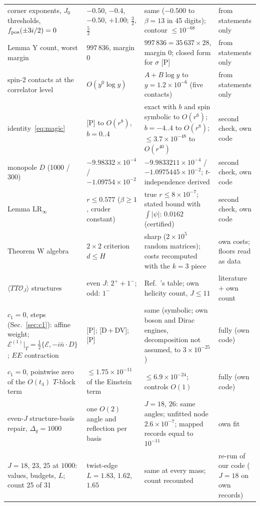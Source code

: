 \documentclass[aps,prl,onecolumn,superscriptaddress,nofootinbib]{revtex4-2}
\begin{document}
\begin{table}[!htbp]
\begin{ruledtabular}
\begin{tabular}{L{5.2cm}L{3.8cm}L{4.4cm}L{3.4cm}}
corner exponents, $J_0$ thresholds, $f_{\rm pos}(\pm3i/2)=0$ & $-0.50$, $-0.4$, $-0.50$, $+1.00$; $\tfrac32$, $\tfrac52$ & same ($-0.500$ to $\beta=13$ in 45 digits); contour $\le10^{-68}$ & from statements only\\
Lemma Y count, worst margin & $997\,836$, margin 0 & $997\,836=35\,637\times28$, margin 0; closed form for $\sigma$ [P] & from statements only\\
spin-2 contacts at the correlator level & $O(y^0\log y)$ & $A+B\log y$ to $y=1.2\times10^{-6}$ (five contacts) & from statements only\\
identity~\eqref{eq:magic} & [P] to $O(r^8)$, $b=0..4$ & exact with $b$ and spin symbolic to $O(r^6)$; $b=-4..4$ to $O(r^8)$; $\le3.7\times10^{-48}$ to $O(r^{40})$ & second check, own code\\
monopole $D$ (1000 / 300) & $-9.98332\times10^{-4}$ / $-1.09754\times10^{-2}$ & $-9.9833211\times10^{-4}$ / $-1.0975445\times10^{-2}$; $t$-independence derived & second check, own code\\
Lemma LR$_\infty$ & $r\le0.577$ ($\beta\ge1$, cruder constant) & true $r\le8\times10^{-7}$; stated bound with $\int|\psi|$: $0.0162$ (certified) & second check, own code\\
Theorem W algebra & $2\times2$ criterion $d\le H$ & sharp ($2\times10^5$ random matrices); costs recomputed with the $k=3$ piece & own costs; floors read as data\\
$\langle TT\mathcal O_J\rangle$ structures & even $J$: $2^++1^-$; odd: $1^-$ & Ref.~\cite{DKKPS}'s table; own helicity count, $J\le11$ & literature $+$ own count\\
$c_1=0$, steps (Sec.~\ref{sec:c1}): affine weight; $\mathcal E^{(1)}|_T=\tfrac12\{\mathcal E,-i\bar n\cdot D\}$; $EE$ contraction & [P]; [D\,+\,DV]; [P] & same (symbolic; own boson and Dirac engines, decomposition not assumed, to $3\times10^{-25}$) & fully (own code)\\
$c_1=0$, pointwise zero of the $O(t_4)$ $T$-block term & $\le1.75\times10^{-11}$ of the Einstein term & $\le6.9\times10^{-24}$; controls $O(1)$ & fully (own code)\\
even-$J$ structure-basis repair, $\Delta_g=1000$ & one $O(2)$ angle and reflection per basis & $J=18$, $26$: same angles; unfitted node $2.6\times10^{-7}$; mapped records equal to $10^{-11}$ & own fit\\
$J=18$, $23$, $25$ at $1000$: values, budgets, $L$; count 25 of 31 & twist-edge $L=1.83$, $1.62$, $1.65$ & same at every mass; count recounted & re-run of our code ($J=18$ on own records)\\
\end{tabular}
\end{ruledtabular}
\end{table}
\end{document}
